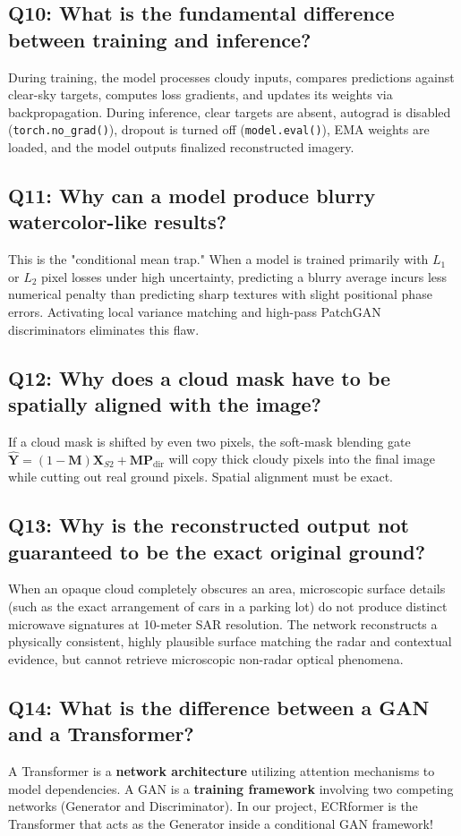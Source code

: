 \subsection*{Q10: What is the fundamental difference between training and inference?}
During training, the model processes cloudy inputs, compares predictions against clear-sky targets, computes loss gradients, and updates its weights via backpropagation. During inference, clear targets are absent, autograd is disabled (\texttt{torch.no\_grad()}), dropout is turned off (\texttt{model.eval()}), EMA weights are loaded, and the model outputs finalized reconstructed imagery.

\subsection*{Q11: Why can a model produce blurry watercolor-like results?}
This is the "conditional mean trap." When a model is trained primarily with $L_1$ or $L_2$ pixel losses under high uncertainty, predicting a blurry average incurs less numerical penalty than predicting sharp textures with slight positional phase errors. Activating local variance matching and high-pass PatchGAN discriminators eliminates this flaw.

\subsection*{Q12: Why does a cloud mask have to be spatially aligned with the image?}
If a cloud mask is shifted by even two pixels, the soft-mask blending gate $\hat{\mathbf{Y}} = (1 - \mathbf{M})\mathbf{X}_{S2} + \mathbf{M}\mathbf{P}_{\text{dir}}$ will copy thick cloudy pixels into the final image while cutting out real ground pixels. Spatial alignment must be exact.

\subsection*{Q13: Why is the reconstructed output not guaranteed to be the exact original ground?}
When an opaque cloud completely obscures an area, microscopic surface details (such as the exact arrangement of cars in a parking lot) do not produce distinct microwave signatures at 10-meter SAR resolution. The network reconstructs a physically consistent, highly plausible surface matching the radar and contextual evidence, but cannot retrieve microscopic non-radar optical phenomena.

\subsection*{Q14: What is the difference between a GAN and a Transformer?}
A Transformer is a \textbf{network architecture} utilizing attention mechanisms to model dependencies. A GAN is a \textbf{training framework} involving two competing networks (Generator and Discriminator). In our project, ECRformer is the Transformer that acts as the Generator inside a conditional GAN framework!

